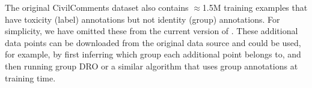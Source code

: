 The original CivilComments dataset \citep{borkan2019nuanced} also contains $\approx$1.5M training examples that have toxicity (label) annotations but not identity (group) annotations.
For simplicity, we have omitted these from the current version of \CivilComments.
These additional data points can be downloaded from the original data source and could be used, for example, by first inferring which group each additional point belongs to, and then running group DRO or a similar algorithm that uses group annotations at training time.
